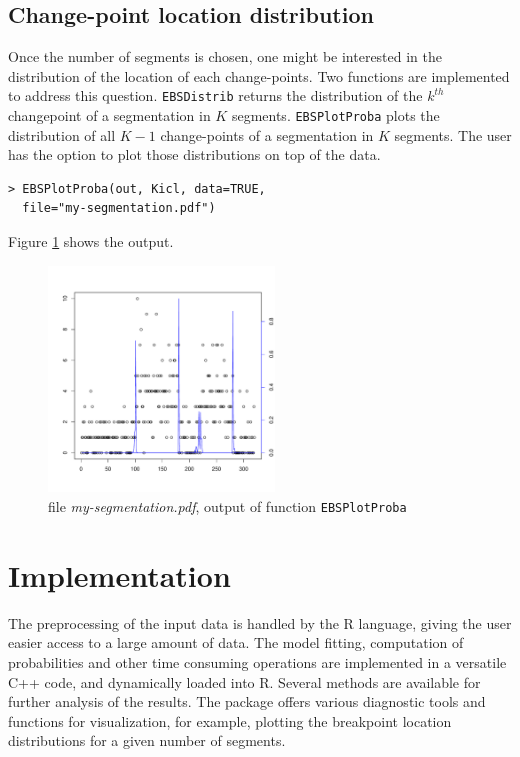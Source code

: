 \documentclass{bioinfo}
\begin{document}
\begin{methods}
\subsection{Change-point location distribution}

Once the number of segments is chosen, one might be interested in the distribution of the location of each change-points. Two functions are implemented to address this question. \texttt{EBSDistrib} returns the distribution of the $k^{th}$ changepoint of a segmentation in $K$ segments. \texttt{EBSPlotProba} plots the distribution of all $K\!-\!1$ change-points of a segmentation in $K$ segments. The user has the option to plot those distributions on top of the data. 
\begin{verbatim}
> EBSPlotProba(out, Kicl, data=TRUE,
  file="my-segmentation.pdf")
\end{verbatim}

Figure \ref{fig:02} shows the output. 

\begin{figure}[!h]%
\centerline{\includegraphics[width=6cm]{my-segmentation.pdf}}
\caption{file \textit{my-segmentation.pdf}, output of function \texttt{EBSPlotProba}}\label{fig:02}
\end{figure}

\end{methods}



\section{Implementation}

The preprocessing of the input data is handled by the R language,
giving the user easier access to a large amount of data. The model fitting, computation of probabilities 
and other time consuming operations are implemented in a versatile C++ code, and dynamically loaded into R.
Several methods are available for further analysis of the results. The package
offers various diagnostic tools and functions for visualization, for
example, plotting the breakpoint location distributions for a given number of segments.
\end{document}
